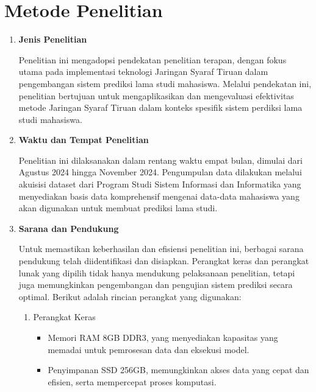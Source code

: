 \section{Metode Penelitian}

\begin{enumerate}
    \item \textbf{Jenis Penelitian}
    
    Penelitian ini mengadopsi pendekatan penelitian terapan, dengan fokus utama pada implementasi teknologi Jaringan Syaraf Tiruan dalam pengembangan sistem prediksi lama studi mahasiswa. Melalui pendekatan ini, penelitian bertujuan untuk mengaplikasikan dan mengevaluasi efektivitas metode Jaringan Syaraf Tiruan dalam konteks spesifik sistem perdiksi lama studi mahasiswa.

    \item \textbf{Waktu dan Tempat Penelitian}
    
    Penelitian ini dilaksanakan dalam rentang waktu empat bulan, dimulai dari Agustus 2024 hingga November 2024. Pengumpulan data dilakukan melalui akuisisi dataset dari Program Studi Sistem Informasi dan Informatika yang menyediakan basis data komprehensif mengenai data-data mahasiswa yang akan digunakan untuk membuat prediksi lama studi.

    \item \textbf{Sarana dan Pendukung}
    
    Untuk memastikan keberhasilan dan efisiensi penelitian ini, berbagai sarana pendukung telah diidentifikasi dan disiapkan. Perangkat keras dan perangkat lunak yang dipilih tidak hanya mendukung pelaksanaan penelitian, tetapi juga memungkinkan pengembangan dan pengujian sistem prediksi secara optimal. Berikut adalah rincian perangkat yang digunakan:

    \begin{enumerate}
        \item Perangkat Keras
        \begin{itemize}
            \item Memori RAM 8GB DDR3, yang menyediakan kapasitas yang memadai untuk pemrosesan data dan eksekusi model.
            \item Penyimpanan SSD 256GB, memungkinkan akses data yang cepat dan efisien, serta mempercepat proses komputasi.
        \end{itemize}


\end{enumerate}
\end{enumerate}
